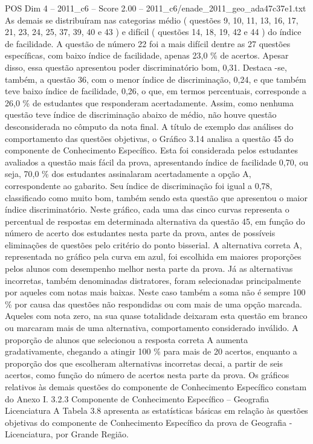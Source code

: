 \begin{textsample}{POS Dim 4 – 2011\_c6 – Score 2.00 – 2011\_c6/enade\_2011\_geo\_ada47c37e1.txt}
As demais se distribuíram nas categorias médio ( questões 9, 10, 11, 13, 16, 17, 21, 23, 24, 25, 37, 39, 40 e 43 ) e difícil ( questões 14, 18, 19, 42 e 44 ) do índice de facilidade.
A questão de número 22 foi a mais difícil dentre as 27 questões específicas, com baixo índice de facilidade, apenas 23,0 \% de acertos.
Apesar disso, essa questão apresentou poder discriminatório bom, 0,31.
Destaca -se, também, a questão 36, com o menor índice de discriminação, 0,24, e que também teve baixo índice de facilidade, 0,26, o que, em termos percentuais, corresponde a 26,0 \% de estudantes que responderam acertadamente.
Assim, como nenhuma questão teve índice de discriminação abaixo de médio, não houve questão desconsiderada no cômputo da nota final.
A título de exemplo das análises do comportamento das questões objetivas, o Gráfico 3.14 analisa a questão 45 do componente de Conhecimento Específico.
Esta foi considerada pelos estudantes avaliados a questão mais fácil da prova, apresentando índice de facilidade 0,70, ou seja, 70,0 \% dos estudantes assinalaram acertadamente a opção A, correspondente ao gabarito.
Seu índice de discriminação foi igual a 0,78, classificado como muito bom, também sendo esta questão que apresentou o maior índice discriminatório.
Neste gráfico, cada uma das cinco curvas representa o percentual de respostas em determinada alternativa da questão 45, em função do número de acerto dos estudantes nesta parte da prova, antes de possíveis eliminações de questões pelo critério do ponto bisserial.
A alternativa correta A, representada no gráfico pela curva em azul, foi escolhida em maiores proporções pelos alunos com desempenho melhor nesta parte da prova.
Já as alternativas incorretas, também denominadas distratores, foram selecionadas principalmente por aqueles com notas mais baixas.
Neste caso também a soma não é sempre 100 \% por causa das questões não respondidas ou com mais de uma opção marcada.
Aqueles com nota zero, na sua quase totalidade deixaram esta questão em branco ou marcaram mais de uma alternativa, comportamento considerado inválido.
A proporção de alunos que selecionou a resposta correta A aumenta gradativamente, chegando a atingir 100 \% para mais de 20 acertos, enquanto a proporção dos que escolheram alternativas incorretas decai, a partir de seis acertos, como função do número de acertos nesta parte da prova.
Os gráficos relativos às demais questões do componente de Conhecimento Específico constam do Anexo I. 3.2.3 Componente de Conhecimento Específico – Geografia Licenciatura A Tabela 3.8 apresenta as estatísticas básicas em relação às questões objetivas do componente de Conhecimento Específico da prova de Geografia - Licenciatura, por Grande Região.

\end{textsample}
